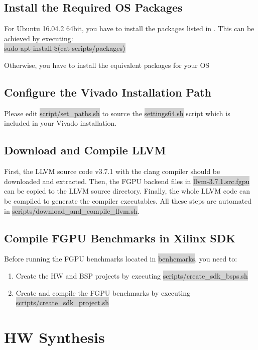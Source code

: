 \documentclass[11pt]{article}
\begin{document}
\subsection{Install the Required OS Packages}
    For Ubuntu 16.04.2 64bit, you have to install the packages listed in .
    This can be achieved by executing: \\
    \centering \colorbox{lightGray}{ sudo apt install \$(cat scripts/packages) }\\
    \raggedright
    Otherwise, you have to install the equivalent packages for your OS

\subsection{Configure the Vivado Installation Path}
Please edit \colorbox{lightGray}{script/set\_paths.sh} to source the \colorbox{lightGray}{settings64.sh} script
which is included in your Vivado installation.

\subsection{Download and Compile LLVM}
First, the LLVM source code v3.7.1 with the clang compiler should be downloaded and extracted.
Then, the FGPU backend files in \colorbox{lightGray}{llvm-3.7.1.src.fgpu} can be copied to the LLVM source directory.
Finally, the whole LLVM code can be compiled to generate the compiler executables.
All these steps are automated in \colorbox{lightGray}{scripts/download\_and\_compile\_llvm.sh}.

\subsection{Compile FGPU Benchmarks in Xilinx SDK}
Before running the FGPU benchmarks located in \colorbox{lightGray}{benhcmarks}, you need to:
\begin{enumerate}
  \item Create the HW and BSP projects by executing \colorbox{lightGray}{scripts/create\_sdk\_bsps.sh}
  \item Create and compile the FGPU benchmarks by executing \colorbox{lightGray}{scripts/create\_sdk\_project.sh}
\end{enumerate}

\section{HW Synthesis}
\end{document}
